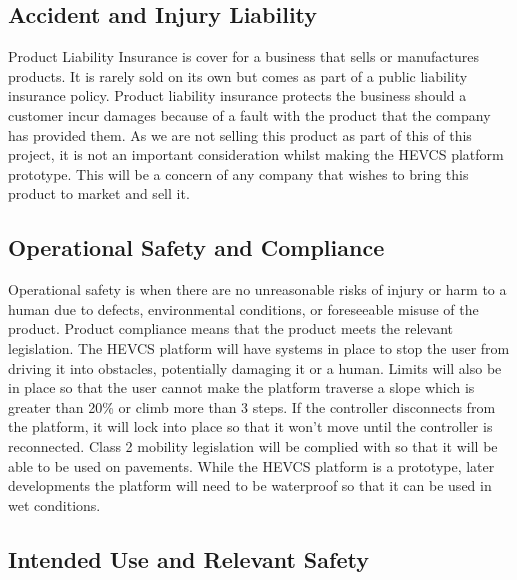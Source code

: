 \documentclass [12pt]{article}
\begin{document}
\subsection{Accident and Injury Liability}\label{sec:Accident_and_Injury_Liabilty}

Product Liability Insurance is cover for a business that sells or manufactures products. It is rarely sold on its own but comes as part of a public liability insurance policy. Product liability insurance protects the business should a customer incur damages because of a fault with the product that the company has provided them. \cite{Liabilty_Insurance}  As we are not selling this product as part of this of this project, it is not an important consideration whilst making the HEVCS platform prototype. This will be a concern of any company that wishes to bring this product to market and sell it. 

\subsection{Operational Safety and Compliance}\label{sec:Operational_Safety_and_Compliance}

Operational safety is when there are no unreasonable risks of injury or harm to a human due to defects, environmental conditions, or foreseeable misuse of the product. Product compliance means that the product meets the relevant legislation.
The HEVCS platform will have systems in place to stop the user from driving it into obstacles, potentially damaging it or a human. Limits will also be in place so that the user cannot make the platform traverse a slope which is greater than 20\% or climb more than 3 steps. If the controller disconnects from the platform, it will lock into place so that it won’t move until the controller is reconnected. Class 2 mobility legislation will be complied with so that it will be able to be used on pavements. While the HEVCS platform is a prototype, later developments the platform will need to be waterproof so that it can be used in wet conditions. \cite{IP_Rating}

\subsection{Intended Use and Relevant Safety}\label{sec:Intended_Use_and_Relevant_Safety}
\end{document}
